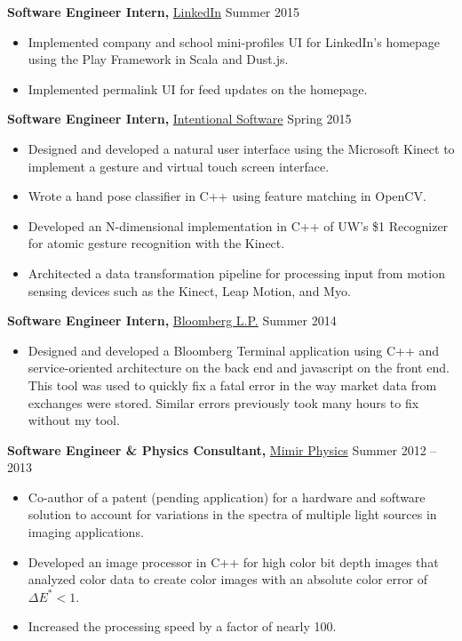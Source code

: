 \documentclass[margin]{res}
\begin{document}
\begin{minipage}{\textwidth}
\begin{resume}
{\bf Software Engineer Intern,} \uline{LinkedIn} \hfill Summer 2015
 \begin{itemize} \itemsep -2pt %
 \item Implemented company and school mini-profiles UI for LinkedIn's homepage using the Play Framework in Scala and Dust.js.
 \item Implemented permalink UI for feed updates on the homepage.
 \end{itemize}



{\bf Software Engineer Intern,} \uline{Intentional Software} \hfill Spring 2015
 \begin{itemize} \itemsep -2pt %
 \item Designed and developed a natural user interface using the Microsoft Kinect to implement a gesture and virtual touch screen interface.
 \item Wrote a hand pose classifier in C++ using feature matching in OpenCV.
 \item Developed an N-dimensional implementation in C++ of UW's \$1 Recognizer for atomic gesture recognition with the Kinect. %
 \item Architected a data transformation pipeline for processing input from motion sensing devices such as the Kinect, Leap Motion, and Myo.
 \end{itemize}



{\bf Software Engineer Intern,} \uline{Bloomberg L.P.} \hfill Summer 2014
 \begin{itemize} \itemsep -2pt
 \item Designed and developed a Bloomberg Terminal application using C++ and service-oriented architecture on the back end and javascript on the front end. This tool was used to quickly fix a fatal error in the way market data from exchanges were stored. Similar errors previously took many hours to fix without my tool.
 \end{itemize}



{\bf Software Engineer \& Physics Consultant,} \uline{Mimir Physics} \hfill Summer 2012 -- 2013
 \begin{itemize} \itemsep -2pt  %
 \item Co-author of a patent (pending application) for a hardware and software solution to account for variations in the spectra of multiple light sources in imaging applications.
 \item Developed an image processor in C++ for high color bit depth images that analyzed color data to create color images with an absolute color error of $\Delta E^* < 1$.
 \item Increased the processing speed by a factor of nearly 100.
 \end{itemize}


\end{resume}
\end{minipage}
\end{document}
